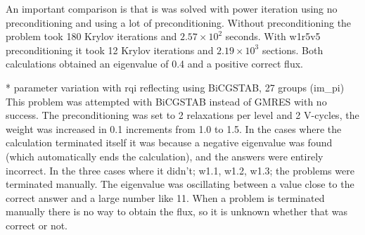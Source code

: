 An important comparison is that is was solved with power iteration using no preconditioning and using a lot of preconditioning. Without preconditioning the problem took 180 Krylov iterations and $2.57 \times 10^{2}$ seconds. With w1r5v5 preconditioning it took 12 Krylov iterations and $2.19 \times 10^{3}$ sections. Both calculations obtained an eigenvalue of 0.4 and a positive correct flux. 

* parameter variation with rqi reflecting using BiCGSTAB, 27 groups (im\_pi)
This problem was attempted with BiCGSTAB instead of GMRES with no success. The preconditioning was set to 2 relaxations per level and 2 V-cycles, the weight was increased in 0.1 increments from 1.0 to 1.5. In the cases where the calculation terminated itself it was because a negative eigenvalue was found (which automatically ends the calculation), and the answers were entirely incorrect. In the three cases where it didn't; w1.1, w1.2, w1.3; the problems were terminated manually. The eigenvalue was oscillating between a value close to the correct answer and a large number like 11. When a problem is terminated manually there is no way to obtain the flux, so it is unknown whether that was correct or not. 

